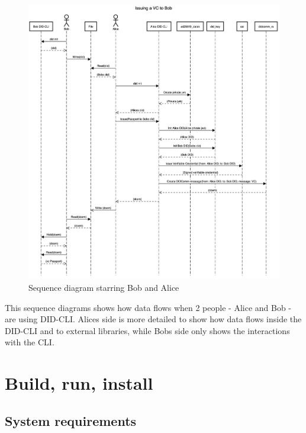 \begin{figure}
\centering
\includegraphics[width=.99\textwidth]{Architecture 1442df162dbe45f4a423ba37d3e12363/Untitled 10.png}
\caption{Sequence diagram starring Bob and Alice}
\end{figure}

This sequence diagrams shows how data flows when 2 people - Alice and
Bob - are using DID-CLI. Alices side is more detailed to show how data
flows inside the DID-CLI and to external libraries, while Bobs side only
shows the interactions with the CLI.




\pagebreak




\hypertarget{build-run-install}{%
\section{Build, run, install}\label{build-run-install}}

\hypertarget{system-requirements}{%
\subsection{System requirements}\label{system-requirements}}

